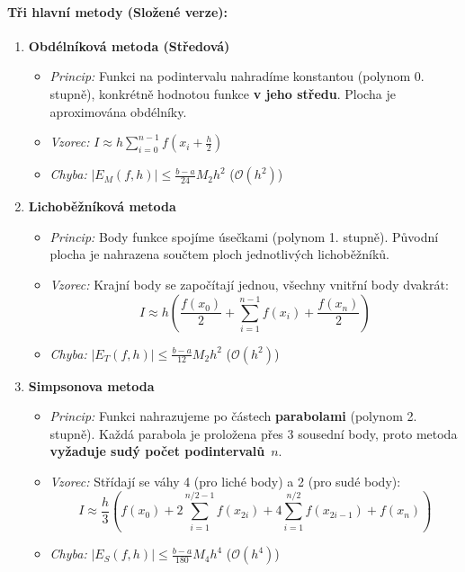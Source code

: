 \paragraph*{Tři hlavní metody (Složené verze):}

\begin{enumerate}
    \item \textbf{Obdélníková metoda (Středová)}
    \begin{itemize}
        \item \textit{Princip:} Funkci na podintervalu nahradíme konstantou (polynom 0. stupně), konkrétně hodnotou funkce \textbf{v jeho středu}. Plocha je aproximována obdélníky.
        \item \textit{Vzorec:} $I \approx h \sum_{i=0}^{n-1} f(x_{i}+\frac{h}{2})$
        \item \textit{Chyba:} $|E_M(f,h)| \leq \frac{b-a}{24}M_2h^2$ ($\mathcal{O}(h^2)$)
    \end{itemize}
    
    \item \textbf{Lichoběžníková metoda}
    \begin{itemize}
        \item \textit{Princip:} Body funkce spojíme úsečkami (polynom 1. stupně). Původní plocha je nahrazena součtem ploch jednotlivých lichoběžníků.
        \item \textit{Vzorec:} Krajní body se započítají jednou, všechny vnitřní body dvakrát:
        \[ I \approx h \left( \frac{f(x_0)}{2} + \sum_{i=1}^{n-1} f(x_i) + \frac{f(x_n)}{2} \right) \]
        \item \textit{Chyba:}  $|E_T(f,h)| \leq \frac{b-a}{12}M_2h^2$ ($\mathcal{O}(h^2)$)
    \end{itemize}

    \item \textbf{Simpsonova metoda}
    \begin{itemize}
        \item \textit{Princip:} Funkci nahrazujeme po částech \textbf{parabolami} (polynom 2. stupně). Každá parabola je proložena přes 3 sousední body, proto metoda \textbf{vyžaduje sudý počet podintervalů}~$n$.
        \item \textit{Vzorec:} Střídají se váhy 4 (pro liché body) a 2 (pro sudé body):
        \[ I \approx \frac{h}{3} \left( f(x_0) + 2\sum_{i=1}^{n/2-1} f(x_{2i}) + 4\sum_{i=1}^{n/2} f(x_{2i-1}) + f(x_n) \right) \]
        \item \textit{Chyba:} $|E_S(f,h)| \leq \frac{b-a}{180}M_4h^4$ ($\mathcal{O}(h^4)$)
    \end{itemize}
\end{enumerate}

